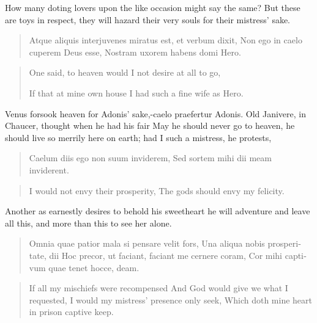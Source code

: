 How many doting lovers upon the like occasion might say the same? But
these are toys in respect, they will hazard their very souls for their
mistress' sake.

\begin{latin}
\begin{verse}
Atque aliquis interjuvenes miratus est, et verbum dixit,
Non ego in caelo cuperem Deus esse,
Nostram uxorem habens domi Hero.
\end{verse}
\end{latin}
\translationrule%
\begin{verse}%
One said, to heaven would I not
desire at all to go,

If that at mine own house I had
such a fine wife as Hero.
\end{verse}%

Venus forsook heaven for Adonis' sake,-caelo praefertur Adonis.
Old Janivere, in Chaucer, thought when he had his fair May he should
never go to heaven, he should live so merrily here on earth; had I such
a mistress, he protests,

\begin{latin}
\begin{verse}
Caelum diis ego non suum inviderem,
Sed sortem mihi dii meam inviderent.
\end{verse}
\end{latin}
\translationrule%
\begin{verse}%
I would not envy their prosperity,
The gods should envy my felicity.
\end{verse}%

Another as earnestly desires to behold his sweetheart he will adventure
and leave all this, and more than this to see her alone.

\begin{latin}
\begin{verse}
Omnia quae patior mala si pensare velit fors,
Una aliqua nobis prosperitate, dii
Hoc precor, ut faciant, faciant me cernere coram,
Cor mihi captivum quae tenet hocce, deam.
\end{verse}
\end{latin}
\translationrule%
\begin{verse}%
If all my mischiefs were recompensed
And God would give we what I requested,
I would my mistress' presence only seek,
Which doth mine heart in prison captive keep.
\end{verse}%

